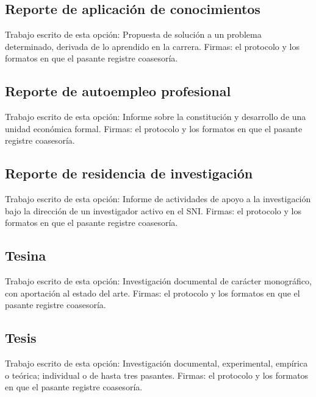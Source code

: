 \subsection{Reporte de aplicación de conocimientos}
Trabajo escrito de esta opción: Propuesta de solución a un problema determinado, derivada de lo aprendido en la carrera. Firmas: el protocolo y los formatos en que el pasante registre coasesoría.
\subsection{Reporte de autoempleo profesional}
Trabajo escrito de esta opción: Informe sobre la constitución y desarrollo de una unidad económica formal. Firmas: el protocolo y los formatos en que el pasante registre coasesoría.
\subsection{Reporte de residencia de investigación}
Trabajo escrito de esta opción: Informe de actividades de apoyo a la investigación bajo la dirección de un investigador activo en el SNI. Firmas: el protocolo y los formatos en que el pasante registre coasesoría.
\subsection{Tesina}
Trabajo escrito de esta opción: Investigación documental de carácter monográfico, con aportación al estado del arte. Firmas: el protocolo y los formatos en que el pasante registre coasesoría.
\subsection{Tesis}
Trabajo escrito de esta opción: Investigación documental, experimental, empírica o teórica; individual o de hasta tres pasantes. Firmas: el protocolo y los formatos en que el pasante registre coasesoría.
